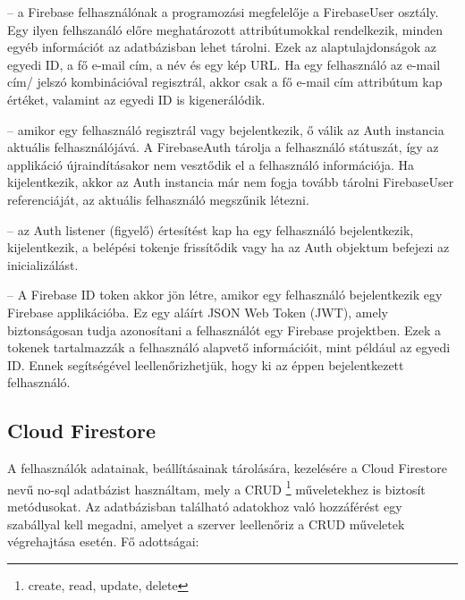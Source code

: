 \begin{description}
	\setlength{\itemsep}{0.04mm}
	\item[Felhasználók tulajdonságai] -- a Firebase felhasználónak a programozási megfelelője a FirebaseUser osztály. Egy ilyen felhszanáló előre meghatározott attribútumokkal rendelkezik, minden egyéb információt az adatbázisban lehet tárolni. Ezek az alaptulajdonságok az egyedi ID, a fő e-mail cím, a név és egy kép URL. Ha egy felhasználó az e-mail cím/ jelszó kombinációval regisztrál, akkor csak a fő e-mail cím attribútum kap értéket, valamint az egyedi ID is kigenerálódik.
	\item[Aktuális felhasználó] -- amikor egy felhasználó regisztrál vagy bejelentkezik, ő válik az Auth instancia aktuális felhasználójává. A FirebaseAuth tárolja a felhasználó státuszát, így az applikáció újraindításakor nem vesztődik el a felhasználó információja. Ha kijelentkezik, akkor az Auth instancia már nem fogja tovább tárolni FirebaseUser referenciáját, az aktuális felhasználó megszűnik létezni.
	\item[Felhasználói életciklus] -- az Auth listener (figyelő) értesítést kap ha egy felhasználó bejelentkezik, kijelentkezik, a belépési tokenje frissítődik vagy ha az Auth objektum befejezi az inicializálást.
	\item[Autentikációs tokenek] -- A Firebase ID token akkor jön létre, amikor egy felhasználó bejelentkezik egy Firebase applikációba. Ez egy aláírt JSON Web Token (JWT), amely biztonságosan tudja azonosítani a felhasználót egy Firebase projektben. Ezek a tokenek tartalmazzák a felhasználó alapvető információit, mint például az egyedi ID. Ennek segítségével leellenőrizhetjük, hogy ki az éppen bejelentkezett felhasználó.
\end{description}

\subsection{Cloud Firestore}

A felhasználók adatainak, beállításainak tárolására, kezelésére a Cloud Firestore\cite{firestore} nevű no-sql adatbázist használtam, mely a CRUD%
\footnote{ %
	create, read, update, delete
}  %
műveletekhez is biztosít metódusokat. Az adatbázisban található adatokhoz való hozzáférést egy szabállyal kell megadni, amelyet a szerver leellenőriz a CRUD műveletek végrehajtása esetén. Fő adottságai:


